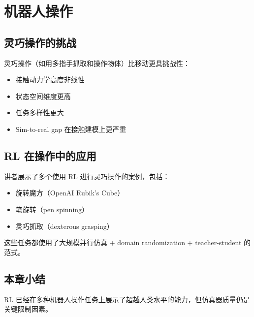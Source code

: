 \section{机器人操作}

\subsection{灵巧操作的挑战}

灵巧操作（如用多指手抓取和操作物体）比移动更具挑战性：
\begin{itemize}
    \item 接触动力学高度非线性
    \item 状态空间维度更高
    \item 任务多样性更大
    \item Sim-to-real gap 在接触建模上更严重
\end{itemize}

\subsection{RL 在操作中的应用}

讲者展示了多个使用 RL 进行灵巧操作的案例，包括：
\begin{itemize}
    \item 旋转魔方（OpenAI Rubik's Cube）
    \item 笔旋转（pen spinning）
    \item 灵巧抓取（dexterous grasping）
\end{itemize}

这些任务都使用了大规模并行仿真 + domain randomization + teacher-student 的范式。

\subsection{本章小结}

RL 已经在多种机器人操作任务上展示了超越人类水平的能力，但仿真器质量仍是关键限制因素。


